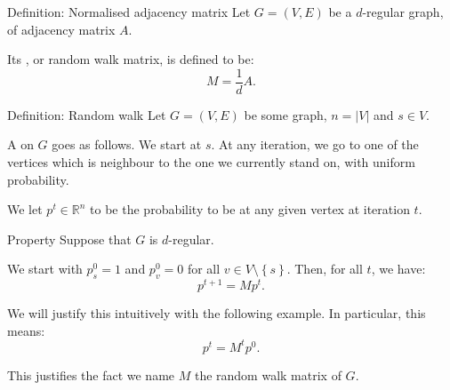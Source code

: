 \documentclass[a4paper]{article}
\begin{document}
\begin{parag}{Definition: Normalised adjacency matrix}
    Let $G = \left(V, E\right)$ be a $d$-regular graph, of adjacency matrix $A$.

    Its , or random walk matrix, is defined to be: 
    \[M = \frac{1}{d} A.\]
\end{parag}

\begin{parag}{Definition: Random walk}
    Let $G = \left(V, E\right)$ be some graph, $n = \left|V\right|$ and $s \in V$.

    A  on $G$ goes as follows. We start at $s$. At any iteration, we go to one of the vertices which is neighbour to the one we currently stand on, with uniform probability. 

    We let $p^t \in \mathbb{R}^{n}$ to be the probability to be at any given vertex at iteration $t$. 

    \begin{subparag}{Property}
        Suppose that $G$ is $d$-regular.

        We start with $p_s^0 = 1$ and $p_v^0 = 0$ for all $v \in V \setminus \left\{s\right\}$. Then, for all $t$, we have: 
        \[p^{t+1} = M p^t.\]

        We will justify this intuitively with the following example. In particular, this means: 
        \[p^t = M^t p^0.\]

        This justifies the fact we name $M$ the random walk matrix of $G$.
    \end{subparag}
\end{parag}
\end{document}
